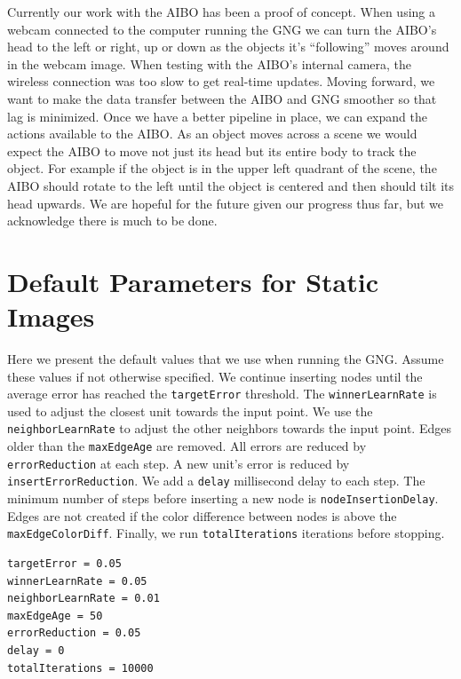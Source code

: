 \documentclass{article}
\renewcommand{\|}{\origbar} %
\begin{document}
Currently our work with the AIBO has been a proof of concept. When using a webcam connected to the computer running the GNG we can turn the AIBO's head to the left or right, up or down as the objects it's ``following'' moves around in the webcam image. When testing with the AIBO's internal camera, the wireless connection was too slow to get real-time updates. Moving forward, we want to make the data transfer between the AIBO and GNG smoother so that lag is minimized. Once we have a better pipeline in place, we can expand the actions available to the AIBO. As an object moves across a scene we would expect the AIBO to move not just its head but its entire body to track the object. For example if the object is in the upper left quadrant of the scene, the AIBO should rotate to the left until the object is centered and then should tilt its head upwards. We are hopeful for the future given our progress thus far, but we acknowledge there is much to be done.




\appendix
\section{Default Parameters for Static Images}
\label{appendix:staticImgParams}

Here we present the default values that we use when running the GNG. Assume these values if not otherwise specified. We continue inserting nodes until the average error has reached the \verb+targetError+ threshold. The \verb+winnerLearnRate+ is used to adjust the closest unit towards the input point. We use the \verb+neighborLearnRate+ to adjust the other neighbors towards the input point. Edges older than the \verb+maxEdgeAge+ are removed. All errors are reduced by \verb+errorReduction+ at each step. A new unit's error is reduced by \verb+insertErrorReduction+. We add a \verb+delay+ millisecond delay to each step. The minimum number of steps before inserting a new node is \verb+nodeInsertionDelay+. Edges are not created if the color difference between nodes is above the \verb+maxEdgeColorDiff+. Finally, we run \verb+totalIterations+ iterations before stopping.

\begin{verbatim}
targetError = 0.05
winnerLearnRate = 0.05
neighborLearnRate = 0.01
maxEdgeAge = 50
errorReduction = 0.05
delay = 0
totalIterations = 10000
\end{verbatim}
\end{document}
